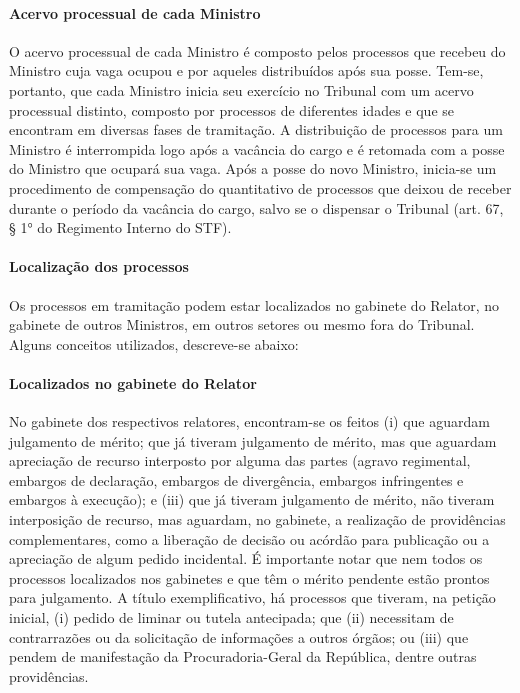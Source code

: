 \documentclass[
]{book}
\theoremstyle{definition}
\theoremstyle{definition}
\theoremstyle{definition}
\theoremstyle{definition}
\theoremstyle{remark}
\begin{document}
\hypertarget{acervo-processual-de-cada-ministro}{%
\paragraph{Acervo processual de cada Ministro}\label{acervo-processual-de-cada-ministro}}

O acervo processual de cada Ministro é composto pelos processos que recebeu do Ministro cuja vaga ocupou e por aqueles distribuídos após sua posse.
Tem-se, portanto, que cada Ministro inicia seu exercício no Tribunal com um acervo processual distinto, composto por processos de diferentes idades e que se encontram em diversas fases de tramitação. A distribuição de processos para um Ministro é interrompida logo após a vacância do cargo e é retomada com a posse do Ministro que ocupará sua vaga. Após a posse do novo Ministro, inicia-se um procedimento de compensação do quantitativo de processos que deixou de receber durante o período da vacância do cargo, salvo se o dispensar o Tribunal (art. 67, § 1° do Regimento Interno do STF).

\hypertarget{localizauxe7uxe3o-dos-processos}{%
\paragraph{Localização dos processos}\label{localizauxe7uxe3o-dos-processos}}

Os processos em tramitação podem estar localizados no gabinete do Relator, no gabinete de outros Ministros, em outros setores ou mesmo fora do Tribunal. Alguns conceitos utilizados, descreve-se abaixo:

\hypertarget{localizados-no-gabinete-do-relator}{%
\paragraph{Localizados no gabinete do Relator}\label{localizados-no-gabinete-do-relator}}

No gabinete dos respectivos relatores, encontram-se os feitos (i) que aguardam julgamento de mérito; que já tiveram julgamento de mérito, mas que aguardam apreciação de recurso interposto por alguma das partes (agravo regimental, embargos de declaração, embargos de divergência, embargos infringentes e embargos à execução); e (iii) que já tiveram julgamento de mérito, não tiveram interposição de recurso, mas aguardam, no gabinete, a realização de providências complementares, como a liberação de decisão ou acórdão para publicação ou a apreciação de algum pedido incidental.
É importante notar que nem todos os processos localizados nos gabinetes e que têm o mérito pendente estão prontos para julgamento. A título exemplificativo, há processos que tiveram, na petição inicial, (i) pedido de liminar ou tutela antecipada; que (ii) necessitam de contrarrazões ou da solicitação de informações a outros órgãos; ou (iii) que pendem de manifestação da Procuradoria-Geral da República, dentre outras providências.
\end{document}
